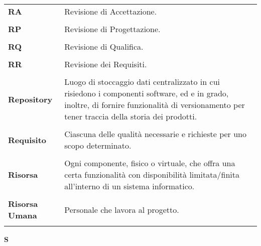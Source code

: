 \begin{longtable}{L{4cm} p{10cm}}
\textbf{RA} & Revisione di Accettazione. \\ 
 \\ 
\textbf{RP} & Revisione di Progettazione. \\ 
 \\ 
\textbf{RQ} & Revisione di Qualifica. \\ 
 \\ 
\textbf{RR} & Revisione dei Requisiti. \\ 
 \\ 
\textbf{Repository} & Luogo di stoccaggio dati centralizzato in cui risiedono i componenti software, ed e in grado, inoltre, di fornire funzionalità di versionamento per tener traccia della storia dei prodotti. \\ 
 \\ 
\textbf{Requisito} & Ciascuna delle qualità necessarie e richieste per uno scopo determinato. \\ 
 \\ 
\textbf{Risorsa} & Ogni componente, fisico o virtuale, che offra una certa funzionalità con disponibilità limitata/finita all'interno di un sistema informatico. \\ 
 \\ 
\textbf{Risorsa Umana} & Personale che lavora al progetto. \\ 
 \\ 
\end{longtable} 
\newpage 
{} 
{} 
\hfill\Huge{\textbf{S}} \\ 
\normalsize 
